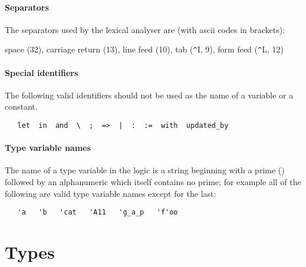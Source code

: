 \paragraph{Separators}

The separators used by the \HOL{} lexical analyser are (with ascii codes in
brackets):

\bigskip

space (32), carriage return (13), line feed (10), tab ({\verb+^+}I, 9),
form feed ({\verb+^+}L, 12)


\paragraph{Special identifiers}

The following valid identifiers should not be used as the name of
a variable or a constant.
%
\begin{verbatim}
   let  in  and  \  ;  =>  |  :  :=  with  updated_by
\end{verbatim}

\paragraph {Type variable names}\label{tyvars}

The name of a type variable in the \HOL{} logic is a string
beginning with a prime () followed by an alphanumeric which itself
contains no prime; for example all of the following are valid type
variable names except for the last:
%
\begin{hol}
\begin{verbatim}
   'a   'b   'cat   'A11   'g_a_p   'f'oo
\end{verbatim}
\end{hol}


\section{Types}

